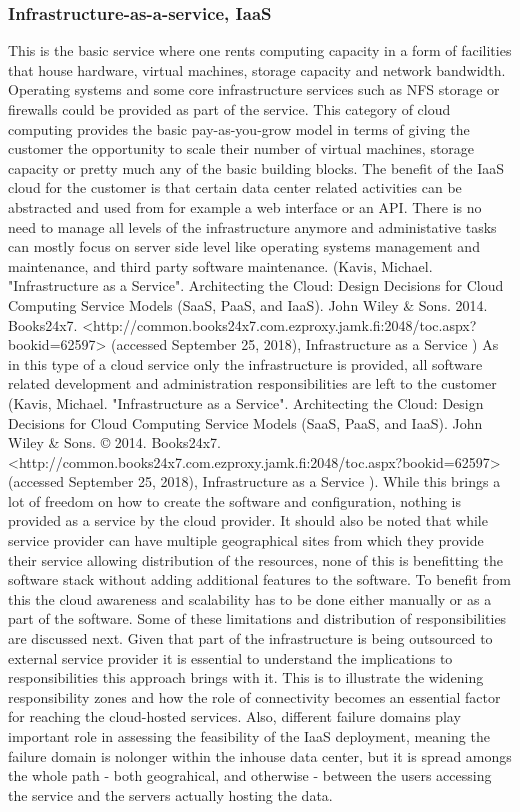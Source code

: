 \documentclass{article}
\begin{document}
\subsubsection{Infrastructure-as-a-service, IaaS}
This is the basic service where one rents computing capacity in a form of facilities that house hardware, virtual machines, storage capacity and network bandwidth.
Operating systems and some core infrastructure services such as NFS storage or firewalls could be provided as part of the service. This category of cloud computing provides the basic pay-as-you-grow model in terms of giving the customer the opportunity to scale their number of virtual machines, storage capacity or pretty much any of the basic building blocks.
The benefit of the IaaS cloud for the customer is that certain data center related activities can be abstracted and used from for example a web interface or an API. There is no need to manage all levels of the infrastructure anymore and administative tasks can mostly focus on server side level like operating systems management and maintenance, and third party software maintenance. (Kavis, Michael. "Infrastructure as a Service". Architecting the Cloud: Design Decisions for Cloud Computing Service Models (SaaS, PaaS, and IaaS). John Wiley \& Sons. 2014. Books24x7. <http://common.books24x7.com.ezproxy.jamk.fi:2048/toc.aspx?bookid=62597> (accessed September 25, 2018), Infrastructure as a Service )
As in this type of a cloud service only the infrastructure is provided, all software related development and administration responsibilities are left to the customer (Kavis, Michael. "Infrastructure as a Service". Architecting the Cloud: Design Decisions for Cloud Computing Service Models (SaaS, PaaS, and IaaS). John Wiley \& Sons. © 2014. Books24x7. <http://common.books24x7.com.ezproxy.jamk.fi:2048/toc.aspx?bookid=62597> (accessed September 25, 2018), Infrastructure as a Service ). While this brings a lot of freedom on how to create the software and configuration, nothing is provided as a service by the cloud provider.
It should also be noted that while service provider can have multiple geographical sites from which they provide their service allowing distribution of the resources, none of this is benefitting the software stack without adding additional features to the software. To benefit from this the cloud awareness and scalability has to be done either manually or as a part of the software. Some of these limitations and distribution of responsibilities are discussed next.
\newpage
Given that part of the infrastructure is being outsourced to external service provider it is essential to understand the implications to responsibilities this approach brings with it. This is to illustrate the widening responsibility zones and how the role of connectivity becomes an essential factor for reaching the cloud-hosted services. Also, different failure domains play important role in assessing the feasibility of the IaaS deployment, meaning the failure domain is nolonger within the inhouse data center, but it is spread amongs the whole path - both geograhical, and otherwise - between the users accessing the service and the servers actually hosting the data.
\end{document}
